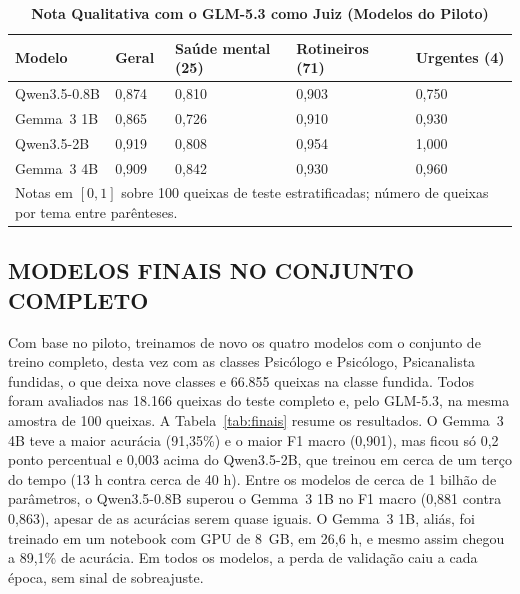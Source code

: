 \documentclass{ieeeaccess}
\begin{document}
\begin{table}[!t]
\caption{\textbf{Nota Qualitativa com o GLM-5.3 como Juiz (Modelos do Piloto)}}
\label{tab:juizpiloto}
\setlength{\tabcolsep}{3pt}
\begin{tabular}{p{56pt}p{36pt}p{42pt}p{42pt}p{40pt}}
\hline
\textbf{Modelo} & \textbf{Geral} & \textbf{Sa\'ude mental (25)} & \textbf{Rotineiros (71)} & \textbf{Urgentes (4)} \\
\hline
Qwen3.5-0.8B & 0,874 & 0,810 & 0,903 & 0,750 \\
Gemma~3 1B & 0,865 & 0,726 & 0,910 & 0,930 \\
Qwen3.5-2B & 0,919 & 0,808 & 0,954 & 1,000 \\
Gemma~3 4B & 0,909 & 0,842 & 0,930 & 0,960 \\
\hline
\multicolumn{5}{p{232pt}}{Notas em $[0, 1]$ sobre 100 queixas de teste estratificadas; n\'umero de queixas por tema entre par\^enteses.}
\end{tabular}
\end{table}

\subsection{MODELOS FINAIS NO CONJUNTO COMPLETO}
\label{sec:finais}
Com base no piloto, treinamos de novo os quatro modelos com o conjunto de treino completo, desta vez com as classes Psic\'ologo e Psic\'ologo, Psicanalista fundidas, o que deixa nove classes e 66.855 queixas na classe fundida. Todos foram avaliados nas 18.166 queixas do teste completo e, pelo GLM-5.3, na mesma amostra de 100 queixas. A Tabela~\ref{tab:finais} resume os resultados. O Gemma~3 4B teve a maior acur\'acia (91,35\%) e o maior F1 macro (0,901), mas ficou s\'o 0,2 ponto percentual e 0,003 acima do Qwen3.5-2B, que treinou em cerca de um ter\c{c}o do tempo (13 h contra cerca de 40 h). Entre os modelos de cerca de 1 bilh\~ao de par\^ametros, o Qwen3.5-0.8B superou o Gemma~3 1B no F1 macro (0,881 contra 0,863), apesar de as acur\'acias serem quase iguais. O Gemma~3 1B, ali\'as, foi treinado em um notebook com GPU de 8~GB, em 26,6 h, e mesmo assim chegou a 89,1\% de acur\'acia. Em todos os modelos, a perda de valida\c{c}\~ao caiu a cada \'epoca, sem sinal de sobreajuste.
\end{document}
